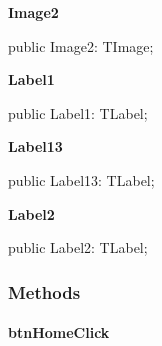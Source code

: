 \documentclass{report}
\newif\ifpdf
\begin{document}
\begin{list}{}
\par  \label{xtypefm.TimdFrm-Image2}
\item[\textbf{Image2}\hfill]
\ifpdf
\begin{flushleft}
\fi
\begin{ttfamily}
public Image2: TImage;\end{ttfamily}

\ifpdf
\end{flushleft}
\fi


\par  \label{xtypefm.TimdFrm-Label1}
\item[\textbf{Label1}\hfill]
\ifpdf
\begin{flushleft}
\fi
\begin{ttfamily}
public Label1: TLabel;\end{ttfamily}

\ifpdf
\end{flushleft}
\fi


\par  \label{xtypefm.TimdFrm-Label13}
\item[\textbf{Label13}\hfill]
\ifpdf
\begin{flushleft}
\fi
\begin{ttfamily}
public Label13: TLabel;\end{ttfamily}

\ifpdf
\end{flushleft}
\fi


\par  \label{xtypefm.TimdFrm-Label2}
\item[\textbf{Label2}\hfill]
\ifpdf
\begin{flushleft}
\fi
\begin{ttfamily}
public Label2: TLabel;\end{ttfamily}

\ifpdf
\end{flushleft}
\fi


\par  \end{list}
\subsubsection*{\large{\textbf{Methods}}\normalsize\hspace{1ex}\hfill}
\paragraph*{btnHomeClick}\hspace*{\fill}
\end{document}
